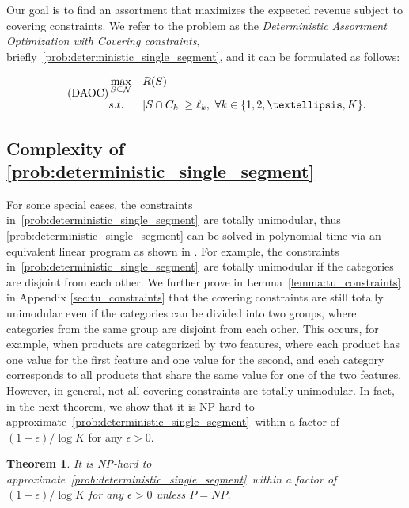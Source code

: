\documentclass[msom,non-blindrev]{informs3} %
\newtheorem{theorem}{Theorem}
\theoremstyle{definition}
\begin{document}
Our goal is to find an assortment that maximizes the expected revenue subject to covering constraints. We refer to the problem as the {\em Deterministic Assortment Optimization with Covering constraints}, briefly~\eqref{prob:deterministic_single_segment}, and it can be formulated as follows:

\begin{equation}
\label{prob:deterministic_single_segment}
\tag{DAOC}
\begin{aligned}
&\max_{S\subseteq\mathcal{N}} && R(S)\\
&\textup{s.t.} && |S\cap C_k|\geq \ell_k,\ \forall k\in\{1,2,\dots,K\}.\\
\end{aligned}
\end{equation}

\subsection{Complexity of \ref{prob:deterministic_single_segment}}

For some special cases, the constraints in~\eqref{prob:deterministic_single_segment}~are totally unimodular, thus \eqref{prob:deterministic_single_segment} can be solved in polynomial time via an equivalent linear program as shown in \cite{sumida2021revenue}. For example, the constraints in~\eqref{prob:deterministic_single_segment}~are totally unimodular if the categories are disjoint from each other. We further prove in Lemma~\ref{lemma:tu_constraints} in Appendix \ref{sec:tu_constraints}  that the covering constraints are still totally unimodular even if the categories can be divided into two groups, where categories from the same group are disjoint from each other. %
This occurs, for example, when products are categorized by two features, where each product has one value for the first feature and one value for the second, and each category corresponds to all products that share the same value for one of the two features.
However, in general, not all covering constraints are totally unimodular. In fact, in the next theorem, we show that it is NP-hard to approximate~\eqref{prob:deterministic_single_segment}~within a factor of $(1+\epsilon)/\log K$ for any $\epsilon>0$. 

\begin{theorem}\label{thm:hardness_single_segment}
	It is NP-hard to approximate~\eqref{prob:deterministic_single_segment}~within a factor of $(1+\epsilon)/\log K$ for any $\epsilon>0$ unless $P=NP$.
\end{theorem}
\end{document}
